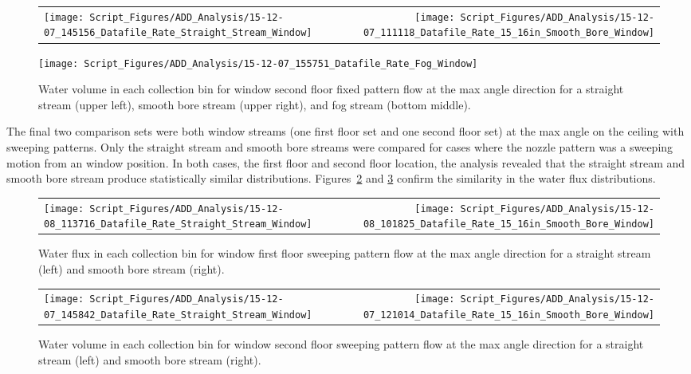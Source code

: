\documentclass[12pt,oneside]{book}
\begin{document}
\begin{figure}[ht]
\begin{tabular*}{\textwidth}{lr}
\texttt{[image: Script\_Figures/ADD\_Analysis/15-12-07\_145156\_Datafile\_Rate\_Straight\_Stream\_Window]} &
\texttt{[image: Script\_Figures/ADD\_Analysis/15-12-07\_111118\_Datafile\_Rate\_15\_16in\_Smooth\_Bore\_Window]} \\
\end{tabular*}
\centering
\texttt{[image: Script\_Figures/ADD\_Analysis/15-12-07\_155751\_Datafile\_Rate\_Fog\_Window]}
\caption[Water Flux for Varying Window Second Floor Fixed Pattern Hose Stream Types]{Water volume in each collection bin for window second floor fixed pattern flow at the max angle direction for a straight stream (upper left), smooth bore stream (upper right), and fog stream (bottom middle).}
\label{fig:Window_SecondFloor_Fixed_Varying_Nozzle}
\end{figure}

\clearpage

The final two comparison sets were both window streams (one first floor set and one second floor set) at the max angle on the ceiling with sweeping patterns. Only the straight stream and smooth bore streams were compared for cases where the nozzle pattern was a sweeping motion from an window position. In both cases, the first floor and second floor location, the analysis revealed that the straight stream and smooth bore stream produce statistically similar distributions. Figures~\ref{fig:Window_FirstFloor_O_Varying_Nozzle} and \ref{fig:Window_SecondFloor_O_Varying_Nozzle} confirm the similarity in the water flux distributions.

\begin{figure}[ht]
\begin{tabular*}{\textwidth}{lr}
\texttt{[image: Script\_Figures/ADD\_Analysis/15-12-08\_113716\_Datafile\_Rate\_Straight\_Stream\_Window]} &
\texttt{[image: Script\_Figures/ADD\_Analysis/15-12-08\_101825\_Datafile\_Rate\_15\_16in\_Smooth\_Bore\_Window]}
\end{tabular*}
\caption[Water Flux for Varying Window First Floor Sweeping Pattern Hose Stream Types]{Water flux in each collection bin for window first floor sweeping pattern flow at the max angle direction for a straight stream (left) and smooth bore stream (right).}
\label{fig:Window_FirstFloor_O_Varying_Nozzle}
\end{figure}

\begin{figure}[ht]
\begin{tabular*}{\textwidth}{lr}
\texttt{[image: Script\_Figures/ADD\_Analysis/15-12-07\_145842\_Datafile\_Rate\_Straight\_Stream\_Window]} &
\texttt{[image: Script\_Figures/ADD\_Analysis/15-12-07\_121014\_Datafile\_Rate\_15\_16in\_Smooth\_Bore\_Window]}
\end{tabular*}
\caption[Water Flux for Varying Window Second Floor Sweeping Pattern Hose Stream Types]{Water volume in each collection bin for window second floor sweeping pattern flow at the max angle direction for a straight stream (left) and smooth bore stream (right).}
\label{fig:Window_SecondFloor_O_Varying_Nozzle}
\end{figure}
\end{document}
